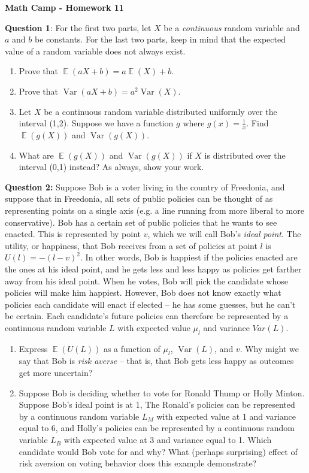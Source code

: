 \documentclass[11pt]{article}
\DeclareMathOperator*{\E}{\mathbb{E}}
\DeclareMathOperator*{\V}{Var}
\begin{document}
\centerline{\bf Math Camp - Homework 11}


\noindent \textbf{Question 1}: For the first two parts, let  $X$ be a \textit{continuous} random variable and $a$ and $b$ be constants. For the last two parts, keep in mind that the expected value of a random variable does not always exist.
\medskip
\begin{enumerate}
\item Prove that $\E(aX+b) = a\E(X)+b$.
\item Prove that $\V(aX+b) = a^2 \V(X)$.
\item Let $X$ be a continuous random variable distributed uniformly over the interval (1,2). Suppose we have a function $g$ where $g(x) = \frac{1}{x}$. Find $\E(g(X))$ and $\V(g(X))$.
\item What are  $\E(g(X))$ and $\V(g(X))$ if $X$ is distributed over the interval (0,1) instead? As always, show your work.
\end{enumerate}

\noindent \textbf{Question 2:} Suppose Bob is a voter living in the country of Freedonia, and suppose that in Freedonia, all sets of public policies can be thought of as representing points on a single axis (e.g. a line running from more liberal to more conservative). Bob has a certain set of public policies that he wants to see enacted. This is represented by point $v$, which we will call Bob's \textit{ideal point}. The utility, or happiness, that Bob receives from a set of policies at point $l$ is $U(l)=-(l-v)^2$. In other words, Bob is happiest if the policies enacted are the ones at his ideal point, and he gets less and less happy as policies get farther away from his ideal point. When he votes, Bob will pick the candidate whose policies will make him happiest. However, Bob does not know exactly what policies each candidate will enact if elected -- he has some guesses, but he can't be certain. Each candidate's future policies can therefore be represented by a continuous random variable $L$ with expected value $\mu_l$ and variance $Var(L)$.

\begin{enumerate}
\item Express $\E(U(L))$ as a function of $\mu_l$, $\V(L)$, and $v$. Why might we say that Bob is \textit{risk averse} -- that is, that Bob gets less happy as outcomes get more uncertain?

\item Suppose Bob is deciding whether to vote for Ronald Thump or Holly Minton. Suppose Bob's ideal point is at 1, The Ronald's policies can be represented by a continuous random variable $L_M$ with expected value at 1 and variance equal to 6, and Holly's policies can be represented by a continuous random variable $L_B$ with expected value at 3 and variance equal to 1. Which candidate would Bob vote for and why? What (perhaps surprising) effect of risk aversion on voting behavior does this example demonstrate?

\end{enumerate}
\end{document}
